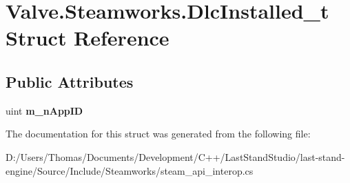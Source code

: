 \hypertarget{structValve_1_1Steamworks_1_1DlcInstalled__t}{}\section{Valve.\+Steamworks.\+Dlc\+Installed\+\_\+t Struct Reference}
\label{structValve_1_1Steamworks_1_1DlcInstalled__t}
\subsection*{Public Attributes}
\begin{DoxyCompactItemize}
\item 
\hypertarget{structValve_1_1Steamworks_1_1DlcInstalled__t_ab66184edbd94d60e8af2ef76574185ef}{}uint {\bfseries m\+\_\+n\+App\+I\+D}\label{structValve_1_1Steamworks_1_1DlcInstalled__t_ab66184edbd94d60e8af2ef76574185ef}

\end{DoxyCompactItemize}


The documentation for this struct was generated from the following file\+:\begin{DoxyCompactItemize}
\item 
D\+:/\+Users/\+Thomas/\+Documents/\+Development/\+C++/\+Last\+Stand\+Studio/last-\/stand-\/engine/\+Source/\+Include/\+Steamworks/steam\+\_\+api\+\_\+interop.\+cs\end{DoxyCompactItemize}
